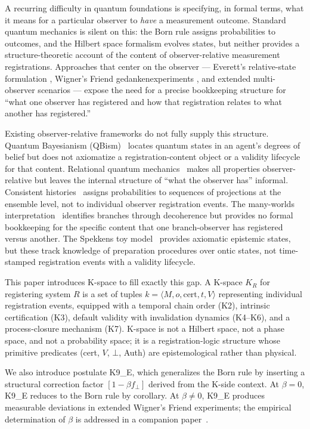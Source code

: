 \documentclass[12pt,a4paper]{article}
\theoremstyle{plain}
\theoremstyle{definition}
\theoremstyle{remark}
\newcommand{\KR}{K_{\!R}}
\newcommand{\fperp}{f_{\!\perp}}
\newcommand{\bk}[1]{\langle #1 \rangle}
\begin{document}
A recurring difficulty in quantum foundations is specifying, in formal terms,
what it means for a particular observer to \emph{have} a measurement outcome.
Standard quantum mechanics is silent on this: the Born rule assigns
probabilities to outcomes, and the Hilbert space formalism evolves states,
but neither provides a structure-theoretic account of the content of
observer-relative measurement registrations.
Approaches that center on the observer --- Everett's relative-state
formulation \cite{Everett1957}, Wigner's Friend gedankenexperiments
\cite{Wigner1961}, and extended multi-observer scenarios
\cite{FR2018,Bong2020,Wiseman2023} --- expose the need for a precise
bookkeeping structure for ``what one observer has registered and how that
registration relates to what another has registered.''

Existing observer-relative frameworks do not fully supply this structure.
Quantum Bayesianism (QBism)~\cite{Fuchs2014} locates quantum states in
an agent's degrees of belief but does not axiomatize a registration-content
object or a validity lifecycle for that content.
Relational quantum mechanics~\cite{Rovelli1996} makes all properties
observer-relative but leaves the internal structure of ``what the observer
has'' informal.
Consistent histories~\cite{Griffiths2002} assigns probabilities to sequences
of projections at the ensemble level, not to individual observer registration
events.
The many-worlds interpretation~\cite{Everett1957} identifies branches through
decoherence but provides no formal bookkeeping for the specific content that
one branch-observer has registered versus another.
The Spekkens toy model~\cite{Spekkens2007} provides axiomatic epistemic states,
but these track knowledge of preparation procedures over ontic states, not
time-stamped registration events with a validity lifecycle.

This paper introduces K-space to fill exactly this gap. A K-space $\KR$ for
registering system $R$ is a set of tuples $k=\bk{M,o,\mathrm{cert},t,V}$
representing individual registration events, equipped with a temporal chain
order (K2), intrinsic certification (K3), default validity with invalidation
dynamics (K4--K6), and a process-closure mechanism (K7). K-space is not a
Hilbert space, not a phase space, and not a probability space; it is a
registration-logic structure whose primitive predicates (cert, $V$, $\bot$,
Auth) are epistemological rather than physical.

We also introduce postulate K9\_E, which generalizes the Born rule by
inserting a structural correction factor $[1-\beta\fperp]$ derived from the
K-side context. At $\beta=0$, K9\_E reduces to the Born rule by corollary.
At $\beta\neq0$, K9\_E produces measurable deviations in extended Wigner's
Friend experiments; the empirical determination of $\beta$ is addressed in a
companion paper~\cite{K9S12_Zenodo}.
\end{document}
